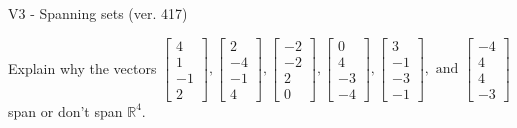 \begin{exercise}
  \begin{exerciseTitle}V3 - Spanning sets (ver. 417)\end{exerciseTitle}
  \begin{exerciseStatement}
    Explain why the vectors \(\left[\begin{array}{r}
4 \\
1 \\
-1 \\
2
\end{array}\right] , \left[\begin{array}{r}
2 \\
-4 \\
-1 \\
4
\end{array}\right] , \left[\begin{array}{r}
-2 \\
-2 \\
2 \\
0
\end{array}\right] , \left[\begin{array}{r}
0 \\
4 \\
-3 \\
-4
\end{array}\right] , \left[\begin{array}{r}
3 \\
-1 \\
-3 \\
-1
\end{array}\right] , \text{ and } \left[\begin{array}{r}
-4 \\
4 \\
4 \\
-3
\end{array}\right]\) span or don't span \(\mathbb{R}^4\). 
	



\end{exerciseStatement}
\end{exercise}
